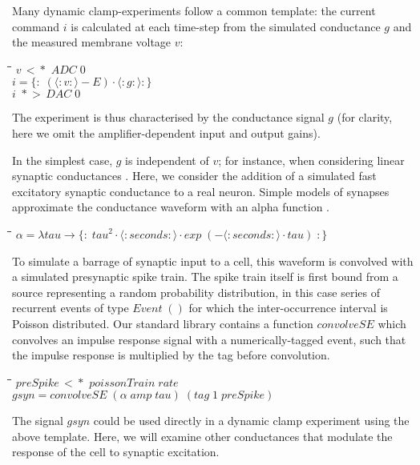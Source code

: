 \documentclass[11pt]{article}
\newlength{\lwidth}\setlength{\lwidth}{4.5cm}
\newlength{\cwidth}\setlength{\cwidth}{8mm} %
\newcommand{\Conid}[1]{\mathit{#1}}
\newcommand{\Varid}[1]{\mathit{#1}}
\begin{document}
Many dynamic clamp-experiments follow a common template: the current
command \ensuremath{\Varid{i}} is calculated at each time-step from the simulated conductance \ensuremath{\Varid{g}}
and the measured membrane voltage \ensuremath{\Varid{v}}:
\begin{tabbing}
\qquad\=\hspace{\lwidth}\=\hspace{\cwidth}\=\+\kill
${\Varid{v}\,<\!\!\!*\,\,\Conid{ADC}\;\mathrm{0}}$\\
${}$\\
${\Varid{i}\mathrel{=}\{\!:\!\;(\langle:\Varid{v}:\rangle\mathbin{-}\Conid{E})\!\cdot\!\langle:\Varid{g}:\rangle\!:\!\}}$\\
${}$\\
${\Varid{i}\,\,*\!\!\!>\,\Conid{DAC}\;\mathrm{0}}$
\end{tabbing}The experiment is thus characterised by the conductance signal $g$
(for clarity, here we omit the amplifier-dependent input and output
gains).

In the simplest case, $g$ is independent of $v$; for instance, when
considering linear synaptic conductances \cite{Mitchell2003}. Here,
we consider the addition of a simulated fast excitatory synaptic
conductance to a real neuron. Simple models of synapses approximate
the conductance waveform with an alpha function \cite{Carnevale2006}.
\begin{tabbing}
\qquad\=\hspace{\lwidth}\=\hspace{\cwidth}\=\+\kill
${\alpha\mathrel{=}\lambda \Varid{tau}\to \{\!:\!\;\Varid{tau}^\mathrm{2}\!\cdot\!\langle:\Varid{seconds}:\rangle\!\cdot\!\Varid{exp}\;(\mathbin{-}\langle:\Varid{seconds}:\rangle\!\cdot\!\Varid{tau})\;\!:\!\}}$
\end{tabbing}
To simulate a barrage of synaptic input to a cell, this waveform is
convolved with a simulated presynaptic spike train. The spike train
itself is first bound from a source representing a random probability
distribution, in this case series of recurrent events of type \ensuremath{\Conid{Event}\;()} for which the inter-occurrence interval is Poisson distributed.
Our standard library contains a function \ensuremath{\Varid{convolveSE}} which
convolves an impulse response signal with a numerically-tagged event,
such that the impulse response is multiplied by the tag before
convolution.
\begin{tabbing}
\qquad\=\hspace{\lwidth}\=\hspace{\cwidth}\=\+\kill
${\Varid{preSpike}\,<\!\!\!*\,\,\Varid{poissonTrain}\;\Varid{rate}}$\\
${\Varid{gsyn}\mathrel{=}\Varid{convolveSE}\;(\alpha\;\Varid{amp}\;\Varid{tau})\;(\Varid{tag}\;\mathrm{1}\;\Varid{preSpike})}$
\end{tabbing}The signal \ensuremath{\Varid{gsyn}} could be used directly in a dynamic clamp experiment
using the above template. Here, we will examine other conductances
that modulate the response of the cell to synaptic excitation.
\end{document}
